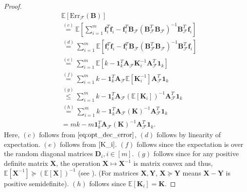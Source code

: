 \documentclass[journal,draftcls,onecolumn]{IEEEtran}
\theoremstyle{mystyle}
\newcommand{\bfA}{\mathbf{A}}
\newcommand{\bfB}{\mathbf{B}}
\newcommand{\cF}{\mathcal{F}}
\begin{document}
\begin{proof}
\begin{align*}
&\mathbb{E}[\text{Err}_{\mathcal{F}}(\mathbf{B})] \\
& \overset{(c)}{=} \mathbb{E} \left[ \sum_{i =1}^m\mathbf{f}_i^T \mathbf{f}_i - \mathbf{f}_i^T \bfB_{\cF}(\bfB_{\cF}^T\bfB_{\cF})^{-1}\bfB_{\cF}^T\mathbf{f}_i \right]\\
& \overset{(d)}{=} \sum_{i =1}^m \mathbb{E} \left[\mathbf{f}_i^T \mathbf{f}_i - \mathbf{f}_i^T \bfB_{\cF}(\bfB_{\cF}^T\bfB_{\cF})^{-1}\bfB_{\cF}^T\mathbf{f}_i \right]\\
& \overset{(e)}{=}  \sum_{i =1}^m \mathbb{E} \left[k -  \mathbf{1}_k^T \bfA_{\cF} \mathbf{K}^{-1}_i\bfA_{\cF}^T\mathbf{1}_k\right]\\
& \overset{(f)}{=}  \sum_{i =1}^m k -  \mathbf{1}_k^T \bfA_{\cF} \mathbb{E} \left[\mathbf{K}^{-1}_i\right]\bfA_{\cF}^T\mathbf{1}_k\\
&\overset{(g)}{\le}  \sum_{i =1}^m k -  \mathbf{1}_k^T \bfA_{\cF} \left(\mathbb{E} \left[\mathbf{K}_i\right]\right)^{-1}\bfA_{\cF}^T\mathbf{1}_k\\
& \overset{(h)}{=} \sum_{i = 1}^m  k - \mathbf{1}_k^T \bfA_{\cF} \left(\mathbf{K}\right)^{-1} \bfA_{\cF}^T\mathbf{1}_k\\
& = mk - m\mathbf{1}_k^T \bfA_{\cF} \left(\mathbf{K}\right)^{-1} \bfA_{\cF}^T\mathbf{1}_k.
\end{align*}
Here, $(c)$ follows from $\eqref{eq:opt_dec_error}$, $(d)$ follows by linearity of expectation. 
$(e)$ follows from $\eqref{K_i}$. $(f)$ follows since the expectation is over the random diagonal 
matrices $\mathbf{D}_i, i \in [m]$. $(g)$ follows since for any positive definite matrix 
$\mathbf{X}$, the operation $\mathbf{X} \mapsto \mathbf{X}^{-1}$ is matrix convex and thus, 
$\mathbb{E}[\mathbf{X}^{-1}] \succeq (\mathbb{E}[\mathbf{X}])^{-1}$ (see \cite{bhatia2009positive}). 
(For matrices $\mathbf{X}, \mathbf{Y}$, $\mathbf{X} \succeq \mathbf{Y}$ means $\mathbf{X}- \mathbf{Y}$ 
is positive semidefinite). $(h)$ follows since $\mathbb{E}\left[\mathbf{K}_i\right] = \mathbf{K}$.
\end{proof}
\end{document}
